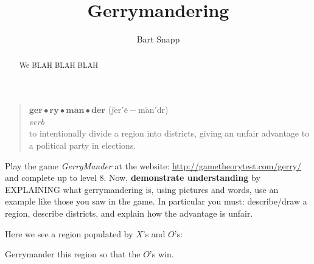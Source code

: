 \documentclass[noauthor,nooutcomes,hints,handout]{ximera}
\title{Gerrymandering}
\author{Bart Snapp}
\begin{document}
\begin{abstract}
  We BLAH BLAH BLAH 
\end{abstract}
\maketitle

\begin{listOutcomes}
\item
\end{listOutcomes}
\begin{mdframed}[style=OutcomeStyle]
\begin{quote}
  $\textbf{ger}\bullet\textbf{ry}\bullet\textbf{man}\bullet\textbf{der}$ (j$\check{\text{e}}$r$'\bar{\text{e}}-$m$\check{\text{a}}$n$'$d{}r)
  \\
  
  \textit{verb}\\

  
\quad to intentionally divide a region into districts, giving an
unfair advantage to a political party in elections.
\end{quote}
\end{mdframed}




\mynewpage






\begin{question}
  Play the game \textsl{GerryMander} at the website:
  \url{http://gametheorytest.com/gerry/} and complete up to level 8.
  Now, \textbf{demonstrate understanding} by EXPLAINING what
  gerrymandering is, using pictures and words, use an example like
  those you saw in the game. In particular you must: describe/draw a
  region, describe districts, and explain how the advantage is unfair.
  
\end{question}

\mynewpage

\begin{question}
  Here we see a region populated by $X$'s and $O$'s:

  Gerrymander this region so that the $O$'s win.
\end{question}

\mynewpage

\begin{question}%
\end{question}%

\end{document}
